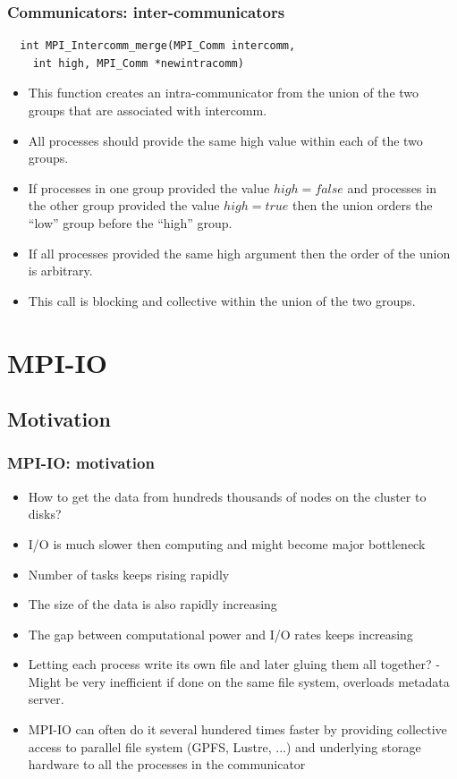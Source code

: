 \documentclass{beamer}
\begin{document}
\begin{frame}[fragile]
  \frametitle{Communicators: inter-communicators}
{\color{mycolorcode}
\begin{verbatim}
  int MPI_Intercomm_merge(MPI_Comm intercomm, 
    int high, MPI_Comm *newintracomm)
\end{verbatim}
}
\begin{itemize}
\item This function creates an intra-communicator from the union of the two groups that are
associated with intercomm.
\item All processes should provide the same high value within each
of the two groups. 
\item If processes in one group provided the value $high = false$ and processes
in the other group provided the value $high = true$ then the union orders the “low” group
before the “high” group. 
\item If all processes provided the same high argument then the order
of the union is arbitrary.
\item This call is blocking and collective within the union of the two
groups.
\end{itemize}
\end{frame}



\section{MPI-IO}

\subsection{Motivation}

\begin{frame}[fragile]
  \frametitle{MPI-IO: motivation}

\begin{itemize}
\item How to get the data from hundreds thousands of nodes on the cluster to disks?
\item I/O is much slower then computing and might become major bottleneck
\item Number of tasks keeps rising rapidly
\item The size of the data is also rapidly increasing
\item The gap between computational power and I/O rates keeps increasing
\item Letting each process write its own file and later gluing them all together? - Might be very inefficient if done on the same file system, overloads metadata server.
\item MPI-IO can often do it several hundered times faster by providing collective access to parallel file system (GPFS, Lustre, ...) and underlying storage hardware to all the processes in the communicator
\end{itemize}
\end{frame}
\end{document}
